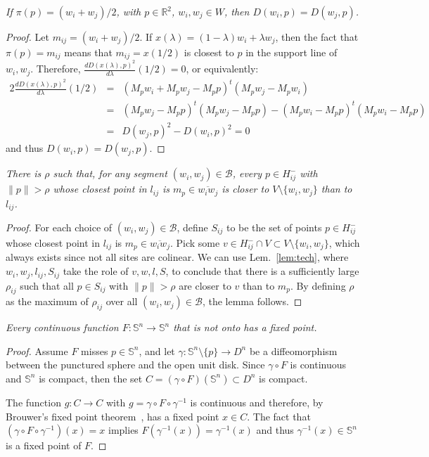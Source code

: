 \documentclass[11pt]{article}
\begin{document}
\emph{
	If $\pi(p)=(w_i+w_j)/2$, with $p\in\mathbb{R}^2$, $w_i,w_j\in W$, then
$D(w_i,p) = D(w_j,p)$. }
\begin{proof}
	Let $m_{ij}=(w_i+w_j)/2$. If $x(\lambda) = (1-\lambda)w_i + \lambda w_j$, 
then the fact that $\pi(p)=m_{ij}$ means that $m_{ij}=x(1/2)$ is closest to $p$
in the support line of $w_i,w_j$. Therefore, $\frac{d D(x(\lambda),p)^2}{d\lambda}(1/2) =
0$, or equivalently:
\begin{eqnarray*}
 2\frac{d D(x(\lambda),p)^2}{d\lambda}(1/2) &=&
		(M_p w_i + M_p w_j - M_p p)^t  (M_p w_j - M_p w_i) \\
	&=& (M_p w_j - M_p p)^t (M_p w_j - M_p p) - (M_p w_i - M_p p)^t (M_p w_i - M_p p) \\
	&=& D(w_j,p)^2 - D(w_i,p)^2 = 0
\end{eqnarray*}
and thus $D(w_i,p) = D(w_j,p)$. 
\end{proof}




\emph{
	There is $\rho$ such that, for any segment $(w_i,w_j)\in\mathcal{B}$, every $p\in H^{-}_{ij}$ with $\|p\| > \rho$
    whose closest point in $l_{ij}$ is $m_p\in\overline{w_i w_j}$ is 
	closer to $V\setminus\{w_i,w_j\}$ than to $l_{ij}$. }
\begin{proof}





For each choice of $(w_i,w_j)\in\mathcal{B}$, define $S_{ij}$ to be the set of
points $p\in H^{-}_{ij}$ whose closest point in $l_{ij}$ is
$m_p\in\overline{w_i w_j}$. 
Pick some $v\in H^{-}_{ij}\cap V\subset V\setminus\{w_i,w_j\}$, which always exists
since not all sites are colinear. 
We can use Lem.~\ref{lem:tech}, 
where $w_i,w_j,l_{ij},S_{ij}$ take the role of $v,w,l,S$, 
to conclude that 
there is a sufficiently large $\rho_{ij}$ such that all $p\in S_{ij}$ with
$\|p\|>\rho$ are closer to $v$ than to $m_p$. 
By defining $\rho$ as the maximum of $\rho_{ij}$ over all
$(w_i,w_j)\in\mathcal{B}$, the lemma follows. 
\end{proof}




\emph{
	Every continuous function $F:\mathbb{S}^n\rightarrow\mathbb{S}^n$ that is not onto has a fixed point. 
}
\begin{proof}
	Assume $F$ misses $p\in\mathbb{S}^n$, and let
$\gamma:\mathbb{S}^n\setminus\{p\}\rightarrow D^n$ be a diffeomorphism
between the punctured sphere and the open unit disk. 
Since $\gamma\circ F$ is continuous and $\mathbb{S}^n$ is compact,
then the set $C = (\gamma\circ F) (\mathbb{S}^n)\subset D^n$ is compact.

The function $g:C\rightarrow C$ with $g = \gamma \circ F\circ\gamma^{-1}$ 
is continuous and therefore, by Brouwer's fixed point theorem~\cite{Milnor}, has a fixed point $x\in C$. 
The fact that $(\gamma \circ F\circ \gamma^{-1}) (x) = x$ implies $F(\gamma^{-1}(x)) = \gamma^{-1}(x)$ 
and thus $\gamma^{-1}(x)\in\mathbb{S}^n$ is a fixed point of $F$. 
\end{proof}
\end{document}
